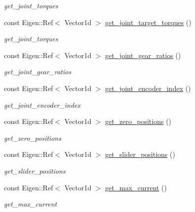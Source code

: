 \begin{DoxyCompactItemize}
\begin{DoxyCompactList}\small\item\em get\+\_\+joint\+\_\+torques \end{DoxyCompactList}\item 
const Eigen\+::\+Ref$<$ Vector1d $>$ \hyperlink{classblmc__robots_1_1SingleMotor_a261200917e713211fa7652b1157eafa1}{get\+\_\+joint\+\_\+target\+\_\+torques} ()
\begin{DoxyCompactList}\small\item\em get\+\_\+joint\+\_\+torques \end{DoxyCompactList}\item 
const Eigen\+::\+Ref$<$ Vector1d $>$ \hyperlink{classblmc__robots_1_1SingleMotor_a8ec5c8ba70bc93ff728300e868755546}{get\+\_\+joint\+\_\+gear\+\_\+ratios} ()
\begin{DoxyCompactList}\small\item\em get\+\_\+joint\+\_\+gear\+\_\+ratios \end{DoxyCompactList}\item 
const Eigen\+::\+Ref$<$ Vector1d $>$ \hyperlink{classblmc__robots_1_1SingleMotor_ab73b8091a40e846a1b6c08ac1d8e0db8}{get\+\_\+joint\+\_\+encoder\+\_\+index} ()
\begin{DoxyCompactList}\small\item\em get\+\_\+joint\+\_\+encoder\+\_\+index \end{DoxyCompactList}\item 
const Eigen\+::\+Ref$<$ Vector1d $>$ \hyperlink{classblmc__robots_1_1SingleMotor_a3a753c2c1b7b82bd716caa4fc3b5f5f0}{get\+\_\+zero\+\_\+positions} ()
\begin{DoxyCompactList}\small\item\em get\+\_\+zero\+\_\+positions \end{DoxyCompactList}\item 
const Eigen\+::\+Ref$<$ Vector1d $>$ \hyperlink{classblmc__robots_1_1SingleMotor_a9c0f3d4686e13d2a8a668a8c26f0bd00}{get\+\_\+slider\+\_\+positions} ()
\begin{DoxyCompactList}\small\item\em get\+\_\+slider\+\_\+positions \end{DoxyCompactList}\item 
const Eigen\+::\+Ref$<$ Vector1d $>$ \hyperlink{classblmc__robots_1_1SingleMotor_a5768cce6fef657b36648ea68fdbb3ed8}{get\+\_\+max\+\_\+current} ()
\begin{DoxyCompactList}\small\item\em get\+\_\+max\+\_\+current \end{DoxyCompactList}\item 

\end{DoxyCompactItemize}
